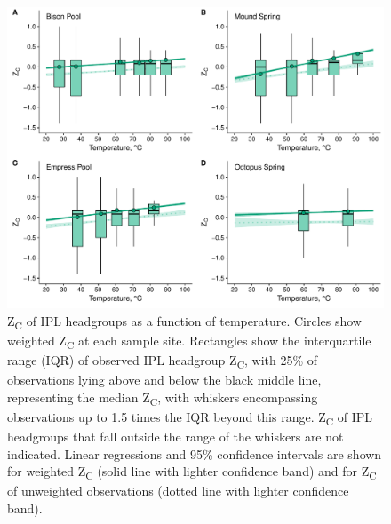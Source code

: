 \singlespace
\begin{figure}[h]
\centering
\includegraphics[width=1\linewidth]{"figs_ch1/boxplot - headgroup ZC"}
\caption[Z\textsubscript{C} of IPL headgroups as a function of temperature]{Z\textsubscript{C} of IPL headgroups as a function of temperature. Circles show weighted Z\textsubscript{C} at each sample site. Rectangles show the interquartile range (IQR) of observed IPL headgroup Z\textsubscript{C}, with 25\% of observations lying above and below the black middle line, representing the median Z\textsubscript{C}, with whiskers encompassing observations up to 1.5 times the IQR beyond this range. Z\textsubscript{C} of IPL headgroups that fall outside the range of the whiskers are not indicated. Linear regressions and 95\% confidence intervals are shown for weighted Z\textsubscript{C} (solid line with lighter confidence band) and for Z\textsubscript{C} of unweighted observations (dotted line with lighter confidence band).}
\label{fig:ZC}
\end{figure}
\doublespace



